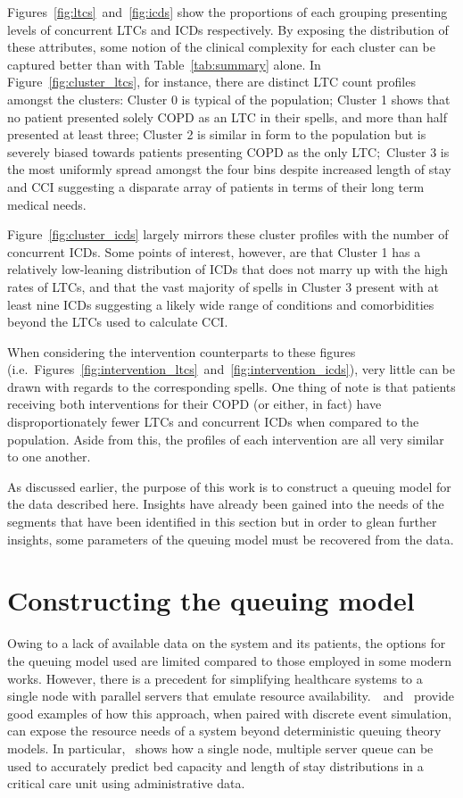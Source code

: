 \documentclass[11pt]{article}
\begin{document}
Figures~\ref{fig:ltcs}~and~\ref{fig:icds} show the proportions of each grouping
presenting levels of concurrent LTCs and ICDs respectively. By exposing the
distribution of these attributes, some notion of the clinical complexity for
each cluster can be captured better than with Table~\ref{tab:summary} alone. In
Figure~\ref{fig:cluster_ltcs}, for instance, there are distinct LTC count
profiles amongst the clusters: Cluster 0 is typical of the population; Cluster 1
shows that no patient presented solely COPD as an LTC in their spells, and more
than half presented at least three; Cluster 2 is similar in form to the
population but is severely biased towards patients presenting COPD as the only
LTC;\ Cluster 3 is the most uniformly spread amongst the four bins despite
increased length of stay and CCI suggesting a disparate array of patients in
terms of their long term medical needs.

Figure~\ref{fig:cluster_icds} largely mirrors these cluster profiles with the
number of concurrent ICDs. Some points of interest, however, are that Cluster 1
has a relatively low-leaning distribution of ICDs that does not marry up with
the high rates of LTCs, and that the vast majority of spells in Cluster 3
present with at least nine ICDs suggesting a likely wide range of conditions and
comorbidities beyond the LTCs used to calculate CCI.\

When considering the intervention counterparts to these figures (i.e.\
Figures~\ref{fig:intervention_ltcs}~and~\ref{fig:intervention_icds}), very
little can be drawn with regards to the corresponding spells. One thing of note
is that patients receiving both interventions for their COPD (or either, in
fact) have disproportionately fewer LTCs and concurrent ICDs when compared to
the population. Aside from this, the profiles of each intervention are all very
similar to one another.

As discussed earlier, the purpose of this work is to construct a queuing model
for the data described here. Insights have already been gained into the needs of
the segments that have been identified in this section but in order to glean
further insights, some parameters of the queuing model must be recovered from
the data.

\section{Constructing the queuing model}\label{sec:model}

Owing to a lack of available data on the system and its patients, the options
for the queuing model used are limited compared to those employed in some modern
works. However, there is a precedent for simplifying healthcare systems to a
single node with parallel servers that emulate resource
availability.~\cite{Steins2013}~and~\cite{Williams2015} provide good examples of
how this approach, when paired with discrete event simulation, can expose the
resource needs of a system beyond deterministic queuing theory models. In
particular,~\cite{Williams2015} shows how a single node, multiple server queue
can be used to accurately predict bed capacity and length of stay distributions
in a critical care unit using administrative data.
\end{document}
